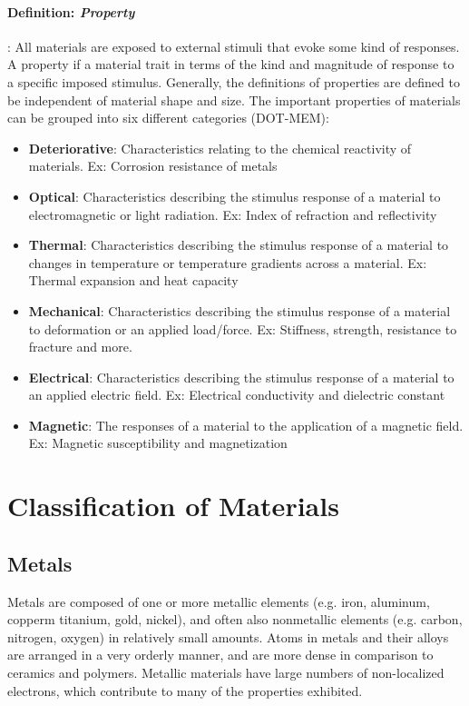 \documentclass{article}
\begin{document}
\paragraph{Definition: \textit{Property}}: All materials are exposed to external stimuli that evoke some kind of responses. A property if a material trait in terms of the kind and magnitude of response to a specific imposed stimulus. Generally, the definitions of properties are defined to be independent of material shape and size. The important properties of materials can be grouped into six different categories (DOT-MEM): \begin{itemize}
    \item \textbf{Deteriorative}: Characteristics relating to the chemical reactivity of materials. Ex: Corrosion resistance of metals
    \item \textbf{Optical}: Characteristics describing the stimulus response of a material to electromagnetic or light radiation. Ex: Index of refraction and reflectivity
    \item \textbf{Thermal}: Characteristics describing the stimulus response of a material to changes in temperature or temperature gradients across a material. Ex: Thermal expansion and heat capacity
    \item \textbf{Mechanical}: Characteristics describing the stimulus response of a material to deformation or an applied load/force. Ex: Stiffness, strength, resistance to fracture and more.
    \item \textbf{Electrical}: Characteristics describing the stimulus response of a material to an applied electric field. Ex: Electrical conductivity and dielectric constant
    \item \textbf{Magnetic}: The responses of a material to the application of a magnetic field. Ex: Magnetic susceptibility and magnetization
\end{itemize}

\section{Classification of Materials}

\subsection{Metals}

Metals are composed of one or more metallic elements (e.g. iron, aluminum, copperm titanium, gold, nickel), and often also nonmetallic elements (e.g. carbon, nitrogen, oxygen) in relatively small amounts. Atoms in metals and their alloys are arranged in a very orderly manner, and are more dense in comparison to ceramics and polymers. Metallic materials have large numbers of non-localized electrons, which contribute to many of the properties exhibited.
\end{document}

